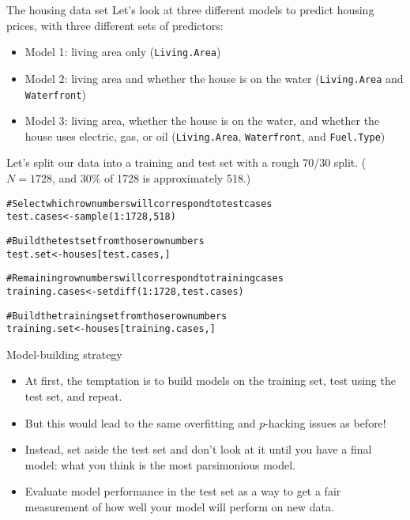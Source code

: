 \documentclass{beamer}\usepackage[]{graphicx}\usepackage[]{color}
\makeatletter
\newcommand{\hlnum}[1]{\textcolor[rgb]{0.824,0.412,0.118}{#1}}%
\newcommand{\hlcom}[1]{\textcolor[rgb]{0.824,0.706,0.549}{#1}}%
\newcommand{\hlopt}[1]{\textcolor[rgb]{1,0.894,0.769}{#1}}%
\newcommand{\hlstd}[1]{\textcolor[rgb]{1,0.894,0.769}{#1}}%
\newcommand{\hlkwb}[1]{\textcolor[rgb]{0.804,0.776,0.451}{#1}}%
\newcommand{\hlkwd}[1]{\textcolor[rgb]{1,0.78,0.769}{#1}}%
\newenvironment{kframe}{%
 \def\at@end@of@kframe{}%
 \ifinner\ifhmode%
  \def\at@end@of@kframe{\end{minipage}}%
  \begin{minipage}{\columnwidth}%
 \fi\fi%
 \def\FrameCommand##1{\hskip\@totalleftmargin \hskip-\fboxsep
 \colorbox{shadecolor}{##1}\hskip-\fboxsep
     \hskip-\linewidth \hskip-\@totalleftmargin \hskip\columnwidth}%
 \MakeFramed {\advance\hsize-\width
   \@totalleftmargin\z@ \linewidth\hsize
   \@setminipage}}%
 {\par\unskip\endMakeFramed%
 \at@end@of@kframe}
\newenvironment{knitrout}{}{} %
\makeatother
\begin{document}
\begin{darkframes}
    \begin{frame}{The housing data set}
      Let's look at three different models to predict housing prices, with three different sets of predictors:

      \begin{itemize}
        \item Model 1: living area only (\texttt{Living.Area})
        \item Model 2: living area and whether the house is on the water (\texttt{Living.Area} and \texttt{Waterfront})
        \item Model 3: living area, whether the house is on the water, and whether the house uses electric, gas, or oil (\texttt{Living.Area}, \texttt{Waterfront}, and \texttt{Fuel.Type})
      \end{itemize}
    \end{frame}

    \begin{frame}[fragile]
      Let's split our data into a training and test set with a rough 70/30 split. ($N=1728$, and 30\% of 1728 is approximately 518.)

      \fontsm
\begin{knitrout}
\begin{kframe}
\begin{alltt}
\hlcom{# Select which row numbers will correspond to test cases}
\hlstd{test.cases} \hlkwb{<-} \hlkwd{sample}\hlstd{(}\hlnum{1}\hlopt{:}\hlnum{1728}\hlstd{,} \hlnum{518}\hlstd{)}

\hlcom{# Build the test set from those row numbers}
\hlstd{test.set} \hlkwb{<-} \hlstd{houses[test.cases,]}

\hlcom{# Remaining row numbers will correspond to training cases}
\hlstd{training.cases} \hlkwb{<-} \hlkwd{setdiff}\hlstd{(}\hlnum{1}\hlopt{:}\hlnum{1728}\hlstd{, test.cases)}

\hlcom{# Build the training set from those row numbers}
\hlstd{training.set} \hlkwb{<-} \hlstd{houses[training.cases,]}
\end{alltt}
\end{kframe}
\end{knitrout}
    \end{frame}

    \begin{frame}{Model-building strategy}
      \begin{itemize}[<+->]
        \item At first, the temptation is to build models on the training set, test using the test set, and repeat.
        \item But this would lead to the same overfitting and $p$-hacking issues as before!
        \item Instead, set aside the test set and don't look at it until you have a final model: what you think is the most parsimonious model.
        \item Evaluate model performance in the test set as a way to get a fair measurement of how well your model will perform on new data.
      \end{itemize}
    \end{frame}


\end{darkframes}
\end{document}
